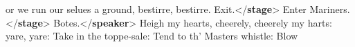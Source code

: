 \begin{shaded}
\hspace*{1em}\hspace*{1em}\hspace*{1em}\hspace*{1em}\hspace*{1em}\hspace*{1em} or we run our selues a ground, bestirre, bestirre.\mbox{}\newline 
\hspace*{1em}\hspace*{1em}Exit.{</\textbf{stage}>}\mbox{}\newline 
\hspace*{1em}\hspace*{1em}\mbox{}\newline 
\hspace*{1em}\mbox{}\newline 
\hspace*{1em}Enter Mariners.{</\textbf{stage}>}\mbox{}\newline 
\hspace*{1em}\mbox{}\newline 
\hspace*{1em}\hspace*{1em}Botes.{</\textbf{speaker}>}\mbox{}\newline 
\hspace*{1em}\hspace*{1em}Heigh my hearts, cheerely, cheerely my harts: yare, yare:\mbox{}\newline 
\hspace*{1em}\hspace*{1em}\hspace*{1em}\hspace*{1em}\hspace*{1em}\hspace*{1em} Take in the toppe-sale: Tend to th' Masters whistle: Blow\mbox{}\newline 

\end{shaded}
